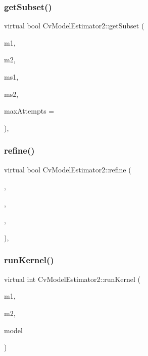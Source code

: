 \subsubsection{\texorpdfstring{get\+Subset()}{getSubset()}}
{\footnotesize\ttfamily virtual bool Cv\+Model\+Estimator2\+::get\+Subset (\begin{DoxyParamCaption}\item[{const Cv\+Mat $\ast$}]{m1,  }\item[{const Cv\+Mat $\ast$}]{m2,  }\item[{Cv\+Mat $\ast$}]{ms1,  }\item[{Cv\+Mat $\ast$}]{ms2,  }\item[{int}]{max\+Attempts = {} }\end{DoxyParamCaption})\hspace{0.3cm}{\ttfamily [protected]}, {\ttfamily [virtual]}}

\mbox{\label{class_cv_model_estimator2_a760edefe34027333ccc6c19e74cb46d1}} 
\subsubsection{\texorpdfstring{refine()}{refine()}}
{\footnotesize\ttfamily virtual bool Cv\+Model\+Estimator2\+::refine (\begin{DoxyParamCaption}\item[{const Cv\+Mat $\ast$}]{,  }\item[{const Cv\+Mat $\ast$}]{,  }\item[{Cv\+Mat $\ast$}]{,  }\item[{int}]{ }\end{DoxyParamCaption})\hspace{0.3cm}{\ttfamily [inline]}, {\ttfamily [virtual]}}

\mbox{\label{class_cv_model_estimator2_ac8c9c1586d3334f468d4152c67554adc}} 
\subsubsection{\texorpdfstring{run\+Kernel()}{runKernel()}}
{\footnotesize\ttfamily virtual int Cv\+Model\+Estimator2\+::run\+Kernel (\begin{DoxyParamCaption}\item[{const Cv\+Mat $\ast$}]{m1,  }\item[{const Cv\+Mat $\ast$}]{m2,  }\item[{Cv\+Mat $\ast$}]{model }\end{DoxyParamCaption})\hspace{0.3cm}{\ttfamily [pure virtual]}}

